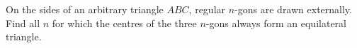 On the sides of an arbitrary triangle $ABC$, regular $n$-gons are drawn externally. Find all $n$ for which the centres of the three $n$-gons always form an equilateral triangle.
